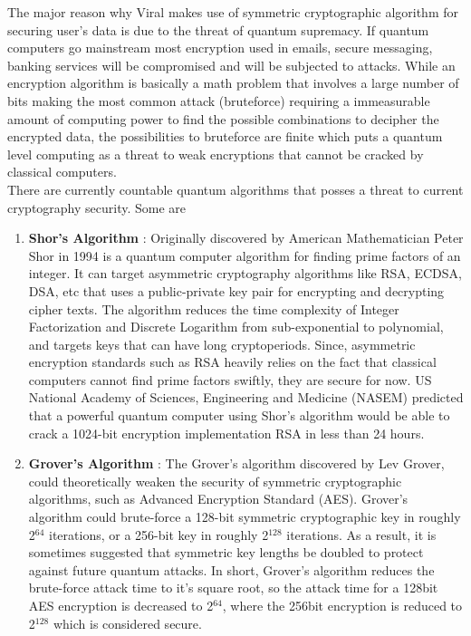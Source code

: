 \documentclass[10pt]{article}
\begin{document}
The major reason why Viral makes use of symmetric cryptographic algorithm for securing user's data is due to the threat of quantum supremacy. If quantum computers go mainstream most encryption used in emails, secure messaging, banking services will be compromised and will be subjected to attacks. While an encryption algorithm is basically a math problem that involves a large number of bits making the most common attack (bruteforce) requiring a immeasurable amount of computing power to find the possible combinations to decipher the encrypted data, the possibilities to bruteforce are finite which puts a quantum level computing as a threat to weak encryptions that cannot be cracked by classical computers.\\

There are currently countable quantum algorithms that posses a threat to current cryptography security. Some are
\begin{enumerate}[leftmargin=+0.2in]
\item \textbf{Shor's Algorithm} : Originally discovered by American Mathematician Peter Shor in 1994 is a quantum computer algorithm for finding prime factors of an integer. It can target asymmetric cryptography algorithms like RSA, ECDSA, DSA, etc that uses a public-private key pair for encrypting and decrypting cipher texts. The algorithm reduces the time complexity of Integer Factorization and Discrete Logarithm from sub-exponential to polynomial, and targets keys that can have long cryptoperiods. Since, asymmetric encryption standards such as RSA heavily relies on the fact that classical computers cannot find prime factors swiftly, they are secure for now. US National Academy of Sciences, Engineering and Medicine (NASEM) predicted that a powerful quantum computer using Shor’s algorithm would be able to crack a 1024-bit encryption implementation RSA in less than 24 hours.
\item \textbf{Grover's Algorithm} : The Grover's algorithm discovered by Lev Grover, could theoretically weaken the security of symmetric cryptographic algorithms, such as Advanced Encryption Standard (AES). Grover's algorithm could brute-force a 128-bit symmetric cryptographic key in roughly 2$^{64}$ iterations, or a 256-bit key in roughly 2$^{128}$ iterations. As a result, it is sometimes suggested that symmetric key lengths be doubled to protect against future quantum attacks.  In short, Grover's algorithm reduces the brute-force attack time to it's square root, so the attack time for a 128bit AES encryption is decreased to 2$^{64}$, where the 256bit encryption is reduced to 2$^{128}$ which is considered secure.
\end{enumerate}
\end{document}
